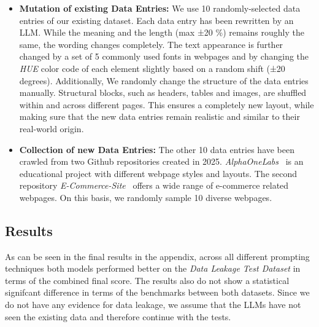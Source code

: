 \begin{itemize}
  \item \textbf{Mutation of existing Data Entries:} We use 10 randomly-selected data entries of our existing 
  dataset. Each data entry has been rewritten by an LLM. While the meaning
    and the length (max ±20 \%) remains roughly the same, the wording changes
    completely. The text appearance is further changed by a set of 5 commonly used fonts in webpages and 
    by changing the \textit{HUE} color code of each element slightly based on a random shift (±20 degrees). \newline
    Additionally, We randomly change the structure of the data entries manually. Structural 
    blocks, such as headers, tables and images, are shuffled within and across different 
    pages. This ensures a completely new layout, while making sure that the new data entries 
    remain realistic and similar to their real-world origin.

  \item \textbf{Collection of new Data Entries:} The other 10 data entries have been crawled from 
    two Github repositories created in 2025. \textit{AlphaOneLabs}~\parencite{alphaonelabs_education} is an educational project 
    with different webpage styles and layouts. The second repository \textit{E-Commerce-Site}~\parencite{nuranferhan_ecommerce}
    offers a wide range of e-commerce related webpages. On this basis, we 
    randomly sample 10 diverse webpages.
\end{itemize}


\subsection{Results}
As can be seen in the final results in the appendix, across 
all different prompting techniques both models performed better on the 
\textit{Data Leakage Test Dataset} in terms of the combined final score.
The results also do not show a statistical 
signifcant difference in terms of the benchmarks between both datasets.
Since we do not have any evidence for data leakage, 
we assume that the LLMs have not seen the existing data and therefore continue 
with the tests.


